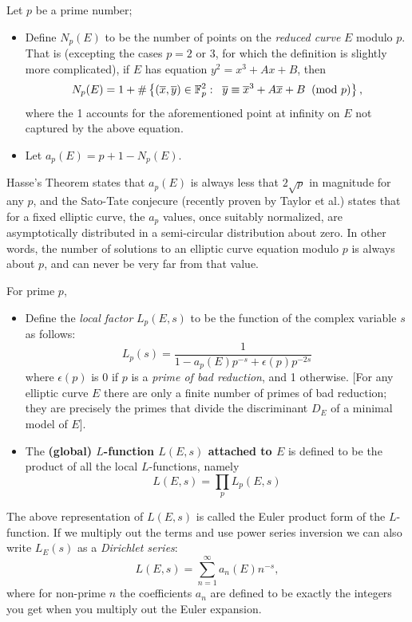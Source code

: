 \begin{definition}
Let $p$ be a prime number;
\begin{itemize}
\item Define $N_p(E)$ to be the number of points on the {\it reduced curve} $E$ modulo $p$. That is (excepting the cases $p=2$ or $3$, for which the definition is slightly more complicated), if $E$ has equation $y^2 = x^3 + Ax+B$, then
\begin{equation}
N_p(E) = 1 + \#\left\{(\overline{x},\overline{y}) \in \mathbb{F}_p^2 : \;\; \overline{y} \equiv \overline{x}^3 + A\overline{x} + B \;\;(\text{mod }p)\right\},
\end{equation}
where the 1 accounts for the aforementioned point at infinity on $E$ not captured by the above equation.
\item Let $a_p(E) = p+1 - N_p(E)$.
\end{itemize}
\end{definition}
Hasse's Theorem states that $a_p(E)$ is always less that $2\sqrt{p}$ in magnitude for any $p$, and the Sato-Tate conjecure (recently proven by Taylor et al.) states that for a fixed elliptic curve, the $a_p$ values, once suitably normalized, are asymptotically distributed in a semi-circular distribution about zero. In other words, the number of solutions to an elliptic curve equation modulo $p$ is always about $p$, and can never be very far from that value.

\begin{definition}  For prime $p$,
\begin{itemize}
\item Define the {\it local factor} $L_p(E,s)$ to be the function of the complex variable $s$ as follows:
\begin{equation}
L_p(s) = \frac{1}{1-a_p(E)p^{-s} + \epsilon(p)p^{-2s}}
\end{equation}
where $\epsilon(p)$ is 0 if $p$ is a {\it prime of bad reduction}, and 1 otherwise. [For any elliptic curve $E$ there are only a finite number of primes of bad reduction; they are precisely the primes that divide the discriminant $D_E$ of a minimal model of $E$].
\item The {\bf (global) $L$-function $L(E,s)$ attached to $E$} is defined to be the product of all the local $L$-functions, namely
\begin{equation}
L(E,s)  = \prod_{p} L_p(E,s)
\end{equation}
\end{itemize}
\end{definition}
The above representation of $L(E,s)$ is called the Euler product form of the $L$-function. If we multiply out the terms and use power series inversion we can also write $L_E(s)$ as a {\it Dirichlet series}:
\begin{equation}
L(E,s) = \sum_{n=1}^{\infty} a_n(E) n^{-s},
\end{equation}
where for non-prime $n$ the coefficients $a_n$ are defined to be exactly the integers you get when you multiply out the Euler expansion.

